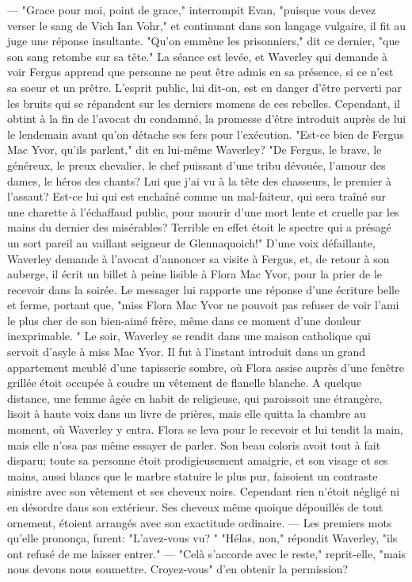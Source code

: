 — "Grace pour moi, point de grace," interrompit Evan, "puisque vous devez verser le sang de Vich Ian Vohr," et continuant dans son langage vulgaire, il fit au juge une réponse insultante.
"Qu’on emmène les prisonniers," dit ce dernier, "que son sang retombe sur sa tête."
La séance est levée, et Waverley qui demande à voir Fergus apprend que personne ne peut être admis en sa présence, si ce n’est sa soeur et un prêtre. L’esprit public, lui dit-on, est en danger d’être perverti par les bruits qui se répandent sur les derniers\setcounter{page}{377} momens de ces rebelles. Cependant, il obtint à la fin de l’avocat du condamné, la promesse d’être introduit auprès de lui le lendemain avant qu’on détache ses fers pour l’exécution.
"Est-ce bien de Fergus Mac Yvor, qu’ils parlent," dit en lui-même Waverley? "De Fergus, le brave, le généreux, le preux chevalier, le chef puissant d’une tribu dévouée, l’amour des dames, le héros des chants? Lui que j’ai vu à la tête des chasseurs, le premier à l’assaut? Est-ce lui qui est enchaîné comme un mal-faiteur, qui sera traîné sur une charette à l’échaffaud public, pour mourir d’une mort lente et cruelle par les mains du dernier des misérables? Terrible en effet étoit le spectre qui a présagé un sort pareil au vaillant seigneur de Glennaquoich!"
D’une voix défaillante, Waverley demande à l’avocat d’annoncer sa visite à Fergus, et, de retour à son auberge, il écrit un billet à peine lisible à Flora Mac Yvor, pour la prier de le recevoir dans la soirée. Le messager lui rapporte une réponse d’une écriture belle et ferme, portant que, "miss Flora Mac Yvor ne pouvoit pas refuser de
\setcounter{page}{378} voir l'ami le plus cher de son bien-aimé frère, même dans ce moment d'une douleur inexprimable. "
Le soir, Waverley se rendit dans une maison catholique qui servoit d'asyle à miss Mac Yvor. Il fut à l'instant introduit dans un grand appartement meublé d'une tapisserie sombre, où Flora assise auprès d'une fenêtre grillée étoit occupée à coudre un vêtement de flanelle blanche. A quelque distance, une femme âgée en habit de religieuse, qui paroissoit une étrangère, lisoit à haute voix dans un livre de prières, mais elle quitta la chambre au moment, où Waverley y entra. Flora se leva pour le recevoir et lui tendit la main, mais elle n'osa pas même essayer de parler. Son beau coloris avoit tout à fait disparu; toute sa personne étoit prodigieusement amaigrie, et son visage et ses mains, aussi blancs que le marbre statuire le plus pur, faisoient un contraste sinistre avec son vêtement et ses cheveux noirs. Cependant rien n'étoit négligé ni en désordre dans son extérieur. Ses cheveux même quoique dépouillés de tout ornement, étoient arrangés avec son exactitude ordinaire. — Les premiers mots qu'elle prononça, furent: "L'avez-vous vu? "\setcounter{page}{379} "Hélas, non," répondit Waverley, "ils ont refusé de me laisser entrer." — "Celà s'accorde avec le reste," reprit-elle, "mais nous devons nous soumettre. Croyez-vous" d'en obtenir la permission?
